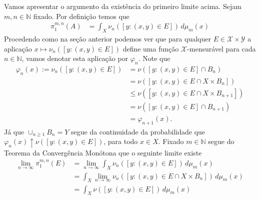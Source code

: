Vamos apresentar o argumento da existência do primeiro limite
acima. Sejam $m,n\in\mathbb{N}$ fixado. Por definição temos 
que 
\begin{align*}
\pi_1^{m,n}(A)
&=
\int_X \nu_n([y:(x,y)\in E ])\, d\mu_m(x)
\end{align*}
Procedendo como na seção anterior podemos ver que 
para qualquer $E\in\mathscr{X}\times\mathscr{Y}$
a aplicação $x\mapsto \nu_n([y:(x,y)\in E ])$ 
define uma função $\mathscr{X}$-mensurável para 
cada $n\in\mathbb{N}$, vamos denotar esta aplicação 
por $\varphi_n$. Note que 
\begin{align*}
\varphi_n(x):=
\nu_n([y:(x,y)\in E ])
&=
\nu([y:(x,y)\in E ]\cap B_n)
\\
&=
\nu([y:(x,y)\in E \cap X\times B_n])
\\
&\leq 
\nu([y:(x,y)\in E \cap X\times B_{n+1}])
\\
&= 
\nu([y:(x,y)\in E]\cap B_{n+1})
\\
&=
\varphi_{n+1}(x).
\end{align*}
Já que $\cup_{n\geq 1} B_n= Y$ segue da continuidade da probabilidade 
que $\varphi_n(x)\uparrow \nu([y:(x,y)\in E])$, para todo 
$x\in X$. Fixado $m\in\mathbb{N}$ 
segue do Teorema da Convergência Monótona que 
o seguinte limite existe 
\begin{align*}
\lim_{n\to\infty}\pi_1^{m,n}(E)
&=
\lim_{n\to\infty}
\int_X \nu_n([y:(x,y)\in E ])\, d\mu_m(x)
\\
&=
\int_X \lim_{n\to\infty} \nu_n([y:(x,y)\in E\cap X\times B_{n} ])\, d\mu_m(x)
\\
&=
\int_X \nu([y:(x,y)\in E ])\, d\mu_m(x)
\end{align*}


